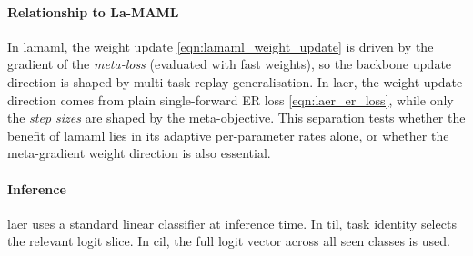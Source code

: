 \paragraph{Relationship to La-MAML}

In \gls{lamaml}, the weight update \eqref{eqn:lamaml_weight_update} is driven by the gradient of the \emph{meta-loss} (evaluated with fast weights), so the backbone update direction is shaped by multi-task replay generalisation. In \gls{laer}, the weight update direction comes from plain single-forward ER loss \eqref{eqn:laer_er_loss}, while only the \emph{step sizes} are shaped by the meta-objective. This separation tests whether the benefit of \gls{lamaml} lies in its adaptive per-parameter rates alone, or whether the meta-gradient weight direction is also essential.

\paragraph{Inference}

\gls{laer} uses a standard linear classifier at inference time. In \gls{til}, task identity selects the relevant logit slice. In \gls{cil}, the full logit vector across all seen classes is used.

